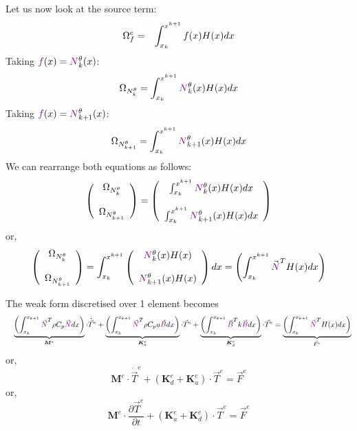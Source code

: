 Let us now look at the source term:
\begin{eqnarray}
{\Omega}_f^e &=&
\int_{x_k}^{x^{k+1}} f(x) H(x) dx \nonumber
\end{eqnarray}
Taking ${\color{violet}f}(x)={\color{violet}N}_k^\theta(x)$: 
\[
{\Omega}_{N_k^\theta}=
\int_{x_k}^{x^{k+1}} {\color{violet}N}_k^\theta(x) H(x) dx \nonumber
\]
Taking ${\color{violet}f}(x)={\color{violet}N}_{k+1}^\theta(x)$: 
\[
{\Omega}_{N_{k+1}^\theta}=
\int_{x_k}^{x^{k+1}} {\color{violet}N}_{k+1}^\theta(x) H(x) dx \nonumber
\]
We can rearrange both equations as follows:
\[
\left(
\begin{array}{cc}
 {\Omega}_{N_k^\theta} \\ \\ {\Omega}_{N_{k+1}^\theta}
\end{array}
\right)
=
\left(
\begin{array}{cc}
\int_{x_k}^{x^{k+1}} {\color{violet}N}_k^\theta(x) H(x) dx \nonumber \\ \\ 
\int_{x_k}^{x^{k+1}} {\color{violet}N}_{k+1}^\theta(x) H(x) dx \nonumber
\end{array}
\right)
\]
or,
\[
\left(
\begin{array}{cc}
 {\Omega}_{N_k^\theta} \\ \\ {\Omega}_{N_{k+1}^\theta}
\end{array}
\right)
=
\int_{x_k}^{x^{k+1}}
\left(
\begin{array}{cc}
{\color{violet}N}_k^\theta(x)  H(x)  \nonumber \\ \\ 
{\color{violet}N}_{k+1}^\theta(x) H(x)  \nonumber
\end{array}
\right)
dx
=
\left(
\int_{x_k}^{x^{k+1}}
{\vec {\color{violet}N}}^T H(x) dx
\right)
\]


The weak form discretised over 1 element becomes
\begin{eqnarray}
&&\underbrace{\left( \int_{x_k}^{x_{k+1}}   {\vec {\color{violet}N}}^T \rho C_p {\vec {\color{violet}N}} dx  \right) }_{\bm M^e} \cdot \dot{\vec T}^e
+
\underbrace{\left( \int_{x_k}^{x_{k+1}}   {\vec {\color{violet}N}}^T \rho C_p u {\vec {\color{violet}B}} dx  \right)}_{{\bm K}_a^e} \cdot {\vec T}^e 
 +
\underbrace{\left( \int_{x_k}^{x_{k+1}}   {\vec {\color{violet}B}}^T k {\vec {\color{violet}B}} dx  \right)}_{{\bm K}_d^e} \cdot {\vec T}^e 
=
\underbrace{\left( \int_{x_k}^{x_{k+1}}   {\vec {\color{violet}N}}^T H(x) dx \right)}_{{\vec F}^e} \nonumber 
\end{eqnarray}
or,
\[
\boxed{
{\bm M}^e \cdot \dot{\vec T}^e + ({\bm K}_d^e + {\bm K}_a^e)\cdot {\vec T}^e = {\vec F}^e
}
\]
or,
\[
\boxed{
{\bm M}^e \cdot \frac{\partial {\vec T}^e}{\partial t} + ({\bm K}_a^e + {\bm K}_d^e) \cdot {\vec T}^e = {\vec F}^e
}
\]

